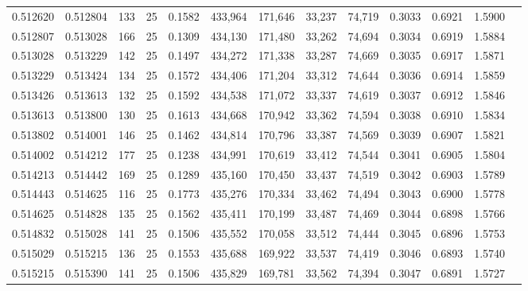 \begin{tabular}{rrrrrrrrrrrrr}
0.512620 & 0.512804 &   133 &  25 &                                     0.1582 & 433,964 & 171,646 &  33,237 &  74,719 & 0.3033 & 0.6921 & 1.5900 \\
0.512807 & 0.513028 &   166 &  25 &                                     0.1309 & 434,130 & 171,480 &  33,262 &  74,694 & 0.3034 & 0.6919 & 1.5884 \\
0.513028 & 0.513229 &   142 &  25 &                                     0.1497 & 434,272 & 171,338 &  33,287 &  74,669 & 0.3035 & 0.6917 & 1.5871 \\
0.513229 & 0.513424 &   134 &  25 &                                     0.1572 & 434,406 & 171,204 &  33,312 &  74,644 & 0.3036 & 0.6914 & 1.5859 \\
0.513426 & 0.513613 &   132 &  25 &                                     0.1592 & 434,538 & 171,072 &  33,337 &  74,619 & 0.3037 & 0.6912 & 1.5846 \\
0.513613 & 0.513800 &   130 &  25 &                                     0.1613 & 434,668 & 170,942 &  33,362 &  74,594 & 0.3038 & 0.6910 & 1.5834 \\
0.513802 & 0.514001 &   146 &  25 &                                     0.1462 & 434,814 & 170,796 &  33,387 &  74,569 & 0.3039 & 0.6907 & 1.5821 \\
0.514002 & 0.514212 &   177 &  25 &                                     0.1238 & 434,991 & 170,619 &  33,412 &  74,544 & 0.3041 & 0.6905 & 1.5804 \\
0.514213 & 0.514442 &   169 &  25 &                                     0.1289 & 435,160 & 170,450 &  33,437 &  74,519 & 0.3042 & 0.6903 & 1.5789 \\
0.514443 & 0.514625 &   116 &  25 &                                     0.1773 & 435,276 & 170,334 &  33,462 &  74,494 & 0.3043 & 0.6900 & 1.5778 \\
0.514625 & 0.514828 &   135 &  25 &                                     0.1562 & 435,411 & 170,199 &  33,487 &  74,469 & 0.3044 & 0.6898 & 1.5766 \\
0.514832 & 0.515028 &   141 &  25 &                                     0.1506 & 435,552 & 170,058 &  33,512 &  74,444 & 0.3045 & 0.6896 & 1.5753 \\
0.515029 & 0.515215 &   136 &  25 &                                     0.1553 & 435,688 & 169,922 &  33,537 &  74,419 & 0.3046 & 0.6893 & 1.5740 \\
0.515215 & 0.515390 &   141 &  25 &                                     0.1506 & 435,829 & 169,781 &  33,562 &  74,394 & 0.3047 & 0.6891 & 1.5727 \\

\end{tabular}
